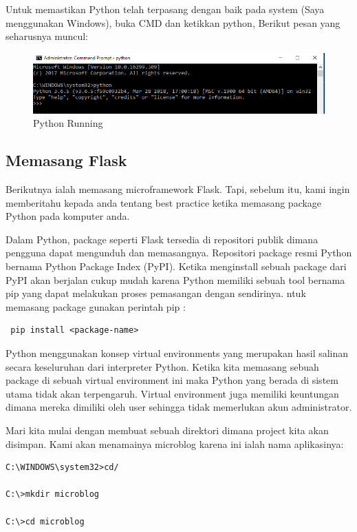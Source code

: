 \documentclass[12pt]{article}
\begin{document}
Untuk memastikan Python telah terpasang dengan baik pada system (Saya menggunakan Windows), buka CMD dan ketikkan python,  Berikut pesan yang seharusnya muncul:

\begin{figure}[ht]
\centerline{\includegraphics[width=1\textwidth]{5Python.PNG}}
\caption{Python Running}
\label{gambar}
\end{figure}

\subsection{Memasang Flask}
Berikutnya ialah memasang microframework Flask. Tapi, sebelum itu, kami ingin memberitahu kepada anda tentang best practice ketika memasang package Python pada komputer anda.

Dalam Python, package seperti Flask tersedia di repositori publik dimana pengguna dapat mengunduh dan memasangnya. Repositori package resmi Python bernama Python Package Index (PyPI). Ketika menginstall sebuah package dari PyPI akan berjalan cukup mudah karena Python memiliki sebuah tool bernama pip yang dapat melakukan proses pemasangan dengan sendirinya. ntuk memasang package gunakan perintah pip :

\begin{verbatim}
 pip install <package-name>
\end{verbatim}

Python menggunakan konsep virtual environments yang merupakan hasil salinan secara keseluruhan dari interpreter Python. Ketika kita memasang sebuah package di sebuah virtual environment ini maka Python yang berada di sistem utama tidak akan terpengaruh. Virtual environment juga memiliki keuntungan dimana mereka dimiliki oleh user sehingga tidak memerlukan akun administrator.

Mari kita mulai dengan membuat sebuah direktori dimana project kita akan disimpan. Kami akan menamainya microblog karena ini ialah nama aplikasinya:

\begin{verbatim}
C:\WINDOWS\system32>cd/

C:\>mkdir microblog

C:\>cd microblog
\end{verbatim}
\end{document}
